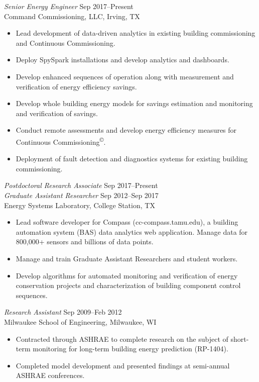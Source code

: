 \documentclass[margin]{res} %
\begin{document}
\begin{resume}
{\textit{Senior Energy Engineer} \hfill Sep 2017--Present} \\
Command Commissioning, LLC, Irving, TX

\begin{itemize}\itemsep -2pt %
\item Lead development of data-driven analytics in existing building commissioning and Continuous Commissioning\textsuperscript{\textregistered{}}.
\item Deploy SpySpark installations and develop analytics and dashboards.
\item Develop enhanced sequences of operation along with measurement and verification of energy efficiency savings.
\item Develop whole building energy models for savings estimation and monitoring and verification of savings.
\item Conduct remote assessments and develop energy efficiency measures for Continuous Commissioning\textsuperscript{\copyright{}}.
\item Deployment of fault detection and diagnostics systems for existing building commissioning.
\end{itemize}

{\sl Postdoctoral Research Associate}  \hfill Sep 2017--Present \\
{\sl Graduate Assistant Researcher} \hfill Sep 2012--Sep 2017 \\
Energy Systems Laboratory, College Station, TX

\begin{itemize} \itemsep -2pt %
    \item Lead software developer for Compass (cc-compass.tamu.edu), a building automation system (BAS) data analytics web application. Manage data for 800,000+ sensors and billions of data points.
    \item Manage and train Graduate Assistant Researchers and student workers.
    \item Develop algorithms for automated monitoring and verification of energy conservation projects and characterization of building component control sequences.
\end{itemize}

\vspace{10pt}

{\sl Research Assistant} \hfill Sep 2009--Feb 2012  \\
Milwaukee School of Engineering, Milwaukee, WI
\begin{itemize}\itemsep -2pt
\item Contracted through ASHRAE to complete research on the subject of short-term monitoring for long-term building energy prediction (RP-1404).
\item Completed model development and presented findings at semi-annual ASHRAE conferences.
\end{itemize}


\end{resume}
\end{document}
